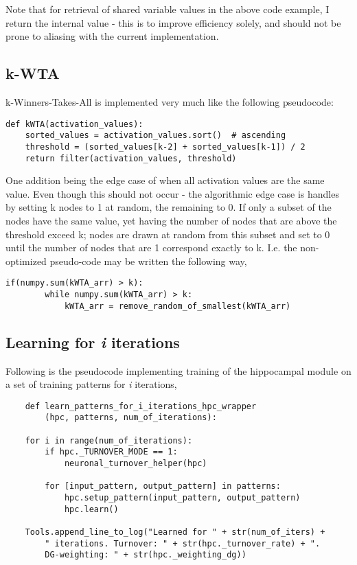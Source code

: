 Note that for retrieval of shared variable values in the above code example, I return the internal value - this is to improve efficiency solely, and should not be prone to aliasing with the current implementation.

\subsection*{k-WTA}

k-Winners-Takes-All is implemented very much like the following pseudocode:

\begin{Verbatim}[fontsize=\small]
def kWTA(activation_values):
    sorted_values = activation_values.sort()  # ascending
    threshold = (sorted_values[k-2] + sorted_values[k-1]) / 2
    return filter(activation_values, threshold)

\end{Verbatim}

One addition being the edge case of when all activation values are the same value. Even though this should not occur - the algorithmic edge case is handles by setting k nodes to 1 at random, the remaining to 0. If only a subset of the nodes have the same value, yet having the number of nodes that are above the threshold exceed k; nodes are drawn at random from this subset and set to 0 until the number of nodes that are 1 correspond exactly to k. I.e. the non-optimized pseudo-code may be written the following way,

\begin{Verbatim}[fontsize=\small]
    if(numpy.sum(kWTA_arr) > k):
        while numpy.sum(kWTA_arr) > k:
            kWTA_arr = remove_random_of_smallest(kWTA_arr)

\end{Verbatim}

\subsection*{Learning for \textit{i} iterations}

Following is the pseudocode implementing training of the hippocampal module on a set of training patterns for \textit{i} iterations,

\begin{verbatim}
    def learn_patterns_for_i_iterations_hpc_wrapper
        (hpc, patterns, num_of_iterations):

    for i in range(num_of_iterations):
        if hpc._TURNOVER_MODE == 1:
            neuronal_turnover_helper(hpc)

        for [input_pattern, output_pattern] in patterns:
            hpc.setup_pattern(input_pattern, output_pattern)
            hpc.learn()

    Tools.append_line_to_log("Learned for " + str(num_of_iters) + 
        " iterations. Turnover: " + str(hpc._turnover_rate) + ". 
        DG-weighting: " + str(hpc._weighting_dg))
    
\end{verbatim}

\clearpage
